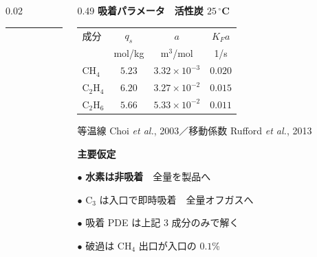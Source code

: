 \begin{frame}[t]
\begin{columns}[T,onlytextwidth]
    \begin{column}{0.02\textwidth}
      \centering
      {\color{black!35}\rule[-6.0cm]{0.6pt}{6.2cm}}
    \end{column}

    \begin{column}{0.49\textwidth}
      {\bfseries 吸着パラメータ　活性炭 $25\,^\circ$C}\par
      \vspace{0.5em}
      {\centering
       {\footnotesize\renewcommand{\arraystretch}{1.12}\setlength{\tabcolsep}{6pt}%
        \begin{tabular}{@{}l c c c@{}}
          \toprule
          成分 & $q_{s}$ & $a$ & $K_F a$ \\
                & {\scriptsize mol/kg} & {\scriptsize m$^3$/mol} & {\scriptsize 1/s} \\
          \midrule
          $\mathrm{CH_4}$   & $5.23$ & $3.32\!\times\!10^{-3}$ & $0.020$ \\
          $\mathrm{C_2H_4}$ & $6.20$ & $3.27\!\times\!10^{-2}$ & $0.015$ \\
          $\mathrm{C_2H_6}$ & $5.66$ & $5.33\!\times\!10^{-2}$ & $0.011$ \\
          \bottomrule
        \end{tabular}}\par}
      \vspace{0.3em}
      {\scriptsize\color{black!55}\raggedright 等温線 Choi \textit{et al.}, 2003／移動係数 Rufford \textit{et al.}, 2013\par}
      \vspace{0.85em}
      {\bfseries 主要仮定}\par
      \vspace{0.3em}
      {\footnotesize\raggedright\linespread{1.22}\selectfont
        $\bullet$ \textbf{\color{SepGreen!45!black}水素は非吸着}　全量を製品へ\par
        \vspace{0.22em}
        $\bullet$ $\mathrm{C_3}$ は入口で即時吸着　全量オフガスへ\par
        \vspace{0.22em}
        $\bullet$ 吸着 PDE は上記 3 成分のみで解く\par
        \vspace{0.22em}
        $\bullet$ 破過は $\mathrm{CH_4}$ 出口が入口の $0.1$\%\par}
    \end{column}
  \end{columns}

\end{frame}
